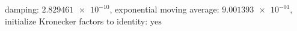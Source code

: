 damping: $\num[scientific-notation=true]{2.829461e-10}$, exponential moving average: $\num[scientific-notation=true]{9.001393e-01}$, initialize Kronecker factors to identity: $\text{yes}$
